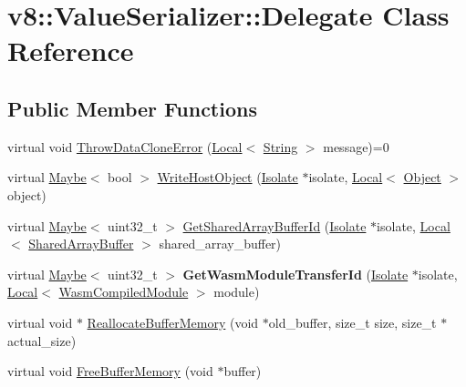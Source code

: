 \hypertarget{classv8_1_1ValueSerializer_1_1Delegate}{}\section{v8\+:\+:Value\+Serializer\+:\+:Delegate Class Reference}
\label{classv8_1_1ValueSerializer_1_1Delegate}
\subsection*{Public Member Functions}
\begin{DoxyCompactItemize}
\item 
virtual void \mbox{\hyperlink{classv8_1_1ValueSerializer_1_1Delegate_a3681bfcd9a6c45f0b12bd7a8bdf34d85}{Throw\+Data\+Clone\+Error}} (\mbox{\hyperlink{classv8_1_1Local}{Local}}$<$ \mbox{\hyperlink{classv8_1_1String}{String}} $>$ message)=0
\item 
virtual \mbox{\hyperlink{classv8_1_1Maybe}{Maybe}}$<$ bool $>$ \mbox{\hyperlink{classv8_1_1ValueSerializer_1_1Delegate_ae97808060b22d7a94517f725922b72c6}{Write\+Host\+Object}} (\mbox{\hyperlink{classv8_1_1Isolate}{Isolate}} $\ast$isolate, \mbox{\hyperlink{classv8_1_1Local}{Local}}$<$ \mbox{\hyperlink{classv8_1_1Object}{Object}} $>$ object)
\item 
virtual \mbox{\hyperlink{classv8_1_1Maybe}{Maybe}}$<$ uint32\+\_\+t $>$ \mbox{\hyperlink{classv8_1_1ValueSerializer_1_1Delegate_a963946ef185d992552e8d9e0e4016137}{Get\+Shared\+Array\+Buffer\+Id}} (\mbox{\hyperlink{classv8_1_1Isolate}{Isolate}} $\ast$isolate, \mbox{\hyperlink{classv8_1_1Local}{Local}}$<$ \mbox{\hyperlink{classv8_1_1SharedArrayBuffer}{Shared\+Array\+Buffer}} $>$ shared\+\_\+array\+\_\+buffer)
\item 
\mbox{\label{classv8_1_1ValueSerializer_1_1Delegate_aa4dada6ecdbb5e3ba4189bfb7c5ffc80}} 
virtual \mbox{\hyperlink{classv8_1_1Maybe}{Maybe}}$<$ uint32\+\_\+t $>$ {\bfseries Get\+Wasm\+Module\+Transfer\+Id} (\mbox{\hyperlink{classv8_1_1Isolate}{Isolate}} $\ast$isolate, \mbox{\hyperlink{classv8_1_1Local}{Local}}$<$ \mbox{\hyperlink{classv8_1_1WasmCompiledModule}{Wasm\+Compiled\+Module}} $>$ module)
\item 
virtual void $\ast$ \mbox{\hyperlink{classv8_1_1ValueSerializer_1_1Delegate_a28e0ab8d14f5c9391df47cf75b4594fc}{Reallocate\+Buffer\+Memory}} (void $\ast$old\+\_\+buffer, size\+\_\+t size, size\+\_\+t $\ast$actual\+\_\+size)
\item 
virtual void \mbox{\hyperlink{classv8_1_1ValueSerializer_1_1Delegate_a6cea3e757221e6e15b0fdb708482a176}{Free\+Buffer\+Memory}} (void $\ast$buffer)
\end{DoxyCompactItemize}


